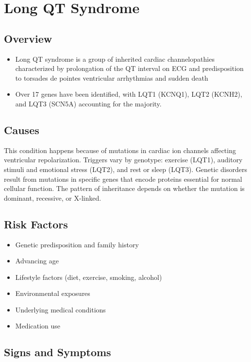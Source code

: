 \chapter{Long QT Syndrome}
\label{sec:Long QT Syndrome}

\section{Overview}


\begin{itemize}[noitemsep]
  \item Long QT syndrome is a group of inherited cardiac channelopathies characterized by prolongation of the QT interval on ECG and predisposition to torsades de pointes ventricular arrhythmias and sudden death
  \item Over 17 genes have been identified, with LQT1 (KCNQ1), LQT2 (KCNH2), and LQT3 (SCN5A) accounting for the majority.
\end{itemize}
\section{Causes}
This condition happens because of mutations in cardiac ion channels affecting ventricular repolarization. Triggers vary by genotype: exercise (LQT1), auditory stimuli and emotional stress (LQT2), and rest or sleep (LQT3). Genetic disorders result from mutations in specific genes that encode proteins essential for normal cellular function. The pattern of inheritance depends on whether the mutation is dominant, recessive, or X-linked.   
\section{Risk Factors}

\begin{itemize}[noitemsep]
  \item Genetic predisposition and family history
  \item Advancing age
  \item Lifestyle factors (diet, exercise, smoking, alcohol)
  \item Environmental exposures
  \item Underlying medical conditions
  \item Medication use
\end{itemize}
\section{Signs and Symptoms}

